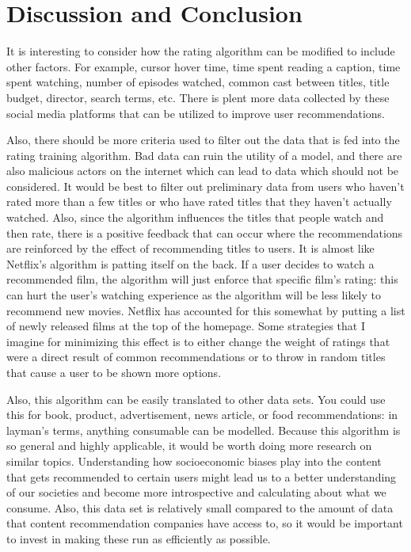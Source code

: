 \documentclass[11pt,a4paper]{article}
\begin{document}


\section{Discussion and Conclusion}

It is interesting to consider how the rating algorithm can be modified to include other factors. For example, cursor hover time, time spent reading a caption, time spent watching, number of episodes watched, common cast between titles, title budget, director, search terms, etc. There is plent more data collected by these social media platforms that can be utilized to improve user recommendations.

Also, there should be more criteria used to filter out the data that is fed into the rating training algorithm. Bad data can ruin the utility of a model, and there are also malicious actors on the internet which can lead to data which should not be considered. It would be best to filter out preliminary data from users who haven't rated more than a few titles or who have rated titles that they haven't actually watched. Also, since the algorithm influences the titles that people watch and then rate, there is a positive feedback that can occur where the recommendations are reinforced by the effect of recommending titles to users. It is almost like Netflix's algorithm is patting itself on the back. If a user decides to watch a recommended film, the algorithm will just enforce that specific film's rating: this can hurt the user's watching experience as the algorithm will be less likely to recommend new movies. Netflix has accounted for this somewhat by putting a list of newly released films at the top of the homepage. Some strategies that I imagine for minimizing this effect is to either change the weight of ratings that were a direct result of common recommendations or to throw in random titles that cause a user to be shown more options.

Also, this algorithm can be easily translated to other data sets. You could use this for book, product, advertisement, news article, or food recommendations: in layman's terms, anything consumable can be modelled. Because this algorithm is so general and highly applicable, it would be worth doing more research on similar topics. Understanding how socioeconomic biases play into the content that gets recommended to certain users might lead us to a better understanding of our societies and become more introspective and calculating about what we consume. Also, this data set is relatively small compared to the amount of data that content recommendation companies have access to, so it would be important to invest in making these run as efficiently as possible.
\end{document}

